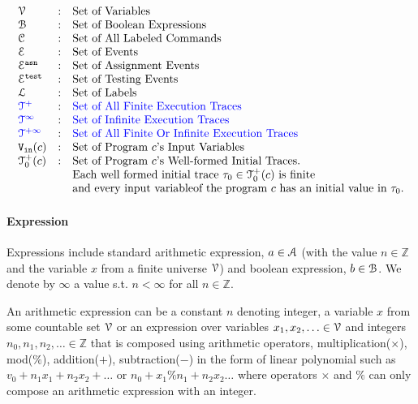 \[
\begin{array}{lll}
\vardom & : & \mbox{Set of Variables}  
\\ 
%
\booldom & : & \mbox{Set of Boolean Expressions}  
\\ 
%
\cdom & : & \mbox{Set of All Labeled Commands} 
\\ 
%
\eventset  & : & \mbox{Set of Events}  
\\
%
\eventset^{\asn}  & : & \mbox{Set of Assignment Events}  
\\
%
\eventset^{\test}  & : & \mbox{Set of Testing Events}  
\\
%
\ldom  & : & \mbox{Set of Labels}  
\\
%
\highlight{\ftdom} & : & \mbox{\highlight{Set of All Finite Execution Traces}}
\\
\highlight{\inftdom} & : & \mbox{\highlight{Set of Infinite  Execution Traces}}
\\
\highlight{\tdom} & : & \mbox{\highlight{Set of All Finite Or Infinite  Execution Traces}}
\\ 
%
\inpvar(c) & : & \mbox{Set of Program $c$'s Input Variables}  
\\
%
\ftdom_0(c) & : & \mbox{Set of Program $c$'s Well-formed Initial Traces.}
\\ & & \mbox{Each well formed initial trace $\trace_0 \in \ftdom_0(c)$ is finite}
\\ & & \mbox{and every input variableof the program $c$ has an initial value in $\trace_0$.}
\end{array}
\]
%
\paragraph{Expression}
Expressions include
standard arithmetic expression, $a \in \mathcal{A}$ (with the value $n \in \mathbb{Z}$ and the variable $x$ from a finite universe $\mathcal{V}$) and boolean expression, $b \in \mathcal{B}$.
We denote by $\infty$ a value s.t. $n < \infty $ for all $n \in \mathbb{Z}$.

An arithmetic expression can be a constant $n$ denoting integer, a variable $x$ from some countable set $\mathcal{V}$ or an expression over variables $x_1, x_2, \ldots \in \mathcal{V}$
and integers $n_0, n_1, n_2, \ldots \in \mathbb{Z}$ that is composed using arithmetic operators,
multiplication($\times $), mod($\%$), addition($+$), subtraction($-$) in the form of linear polynomial such as $v_0 + n_1 x_1 + n_2 x_2 + \ldots$ or $n_0 + x_1 \% n_1 + n_2 x_2 \ldots$ where operators $\times$ and $\%$ can only compose an arithmetic expression with an integer.

